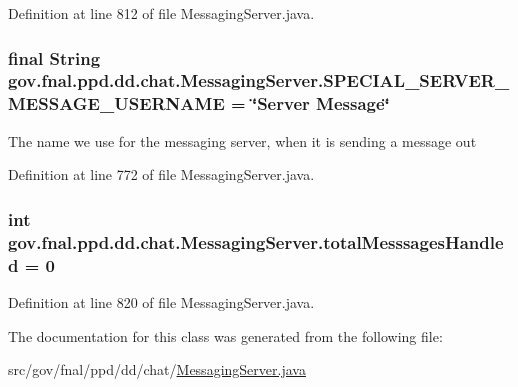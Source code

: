 Definition at line 812 of file Messaging\-Server.\-java.

\hypertarget{classgov_1_1fnal_1_1ppd_1_1dd_1_1chat_1_1MessagingServer_a738da0a18944421491268d2220a3c7a4}{
\subsubsection[{S\-P\-E\-C\-I\-A\-L\-\_\-\-S\-E\-R\-V\-E\-R\-\_\-\-M\-E\-S\-S\-A\-G\-E\-\_\-\-U\-S\-E\-R\-N\-A\-M\-E}]{\setlength{\rightskip}{0pt plus 5cm}final String gov.\-fnal.\-ppd.\-dd.\-chat.\-Messaging\-Server.\-S\-P\-E\-C\-I\-A\-L\-\_\-\-S\-E\-R\-V\-E\-R\-\_\-\-M\-E\-S\-S\-A\-G\-E\-\_\-\-U\-S\-E\-R\-N\-A\-M\-E = \char`\"{}Server Message\char`\"{}\hspace{0.3cm}{\ttfamily [static]}}}\label{classgov_1_1fnal_1_1ppd_1_1dd_1_1chat_1_1MessagingServer_a738da0a18944421491268d2220a3c7a4}
The name we use for the messaging server, when it is sending a message out 

Definition at line 772 of file Messaging\-Server.\-java.

\hypertarget{classgov_1_1fnal_1_1ppd_1_1dd_1_1chat_1_1MessagingServer_a6847562b2441991b550f7b3cb7fe8f2d}{
\subsubsection[{total\-Messsages\-Handled}]{\setlength{\rightskip}{0pt plus 5cm}int gov.\-fnal.\-ppd.\-dd.\-chat.\-Messaging\-Server.\-total\-Messsages\-Handled = 0\hspace{0.3cm}{\ttfamily [protected]}}}\label{classgov_1_1fnal_1_1ppd_1_1dd_1_1chat_1_1MessagingServer_a6847562b2441991b550f7b3cb7fe8f2d}


Definition at line 820 of file Messaging\-Server.\-java.



The documentation for this class was generated from the following file\-:\begin{DoxyCompactItemize}
\item 
src/gov/fnal/ppd/dd/chat/\hyperlink{MessagingServer_8java}{Messaging\-Server.\-java}\end{DoxyCompactItemize}
